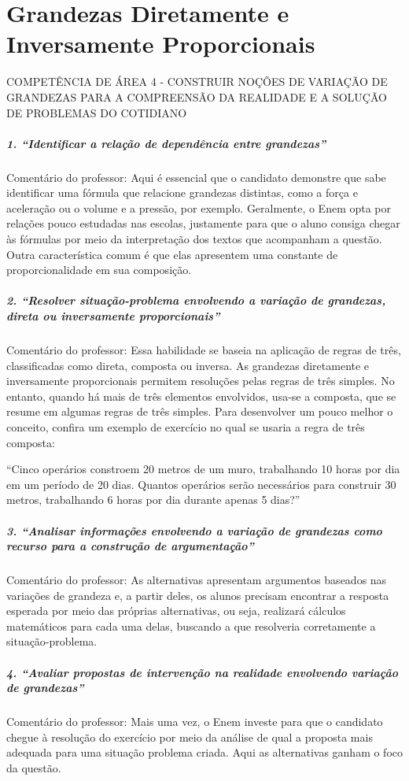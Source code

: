 \chapter{Grandezas Diretamente e Inversamente Proporcionais}

COMPETÊNCIA DE ÁREA 4 - CONSTRUIR NOÇÕES DE VARIAÇÃO DE GRANDEZAS PARA A COMPREENSÃO DA REALIDADE E A SOLUÇÃO DE PROBLEMAS DO COTIDIANO

\paragraph{1. “Identificar a relação de dependência entre grandezas”}
Comentário do professor: Aqui é essencial que o candidato demonstre que sabe identificar uma fórmula que relacione grandezas distintas, como a força e aceleração ou o volume e a pressão, por exemplo. Geralmente, o Enem opta por relações pouco estudadas nas escolas, justamente para que o aluno consiga chegar às fórmulas por meio da interpretação dos textos que acompanham a questão. Outra característica comum é que elas apresentem uma constante de proporcionalidade em sua composição.

\paragraph{2. “Resolver situação-problema envolvendo a variação de grandezas, direta ou inversamente proporcionais”}
Comentário do professor: Essa habilidade se baseia na aplicação de regras de três, classificadas como direta, composta ou inversa. As grandezas diretamente e inversamente proporcionais permitem resoluções pelas regras de três simples. No entanto, quando há mais de três elementos envolvidos, usa-se a composta, que se resume em algumas regras de três simples. Para desenvolver um pouco melhor o conceito, confira um exemplo de exercício no qual se usaria a regra de três composta:

“Cinco operários constroem 20 metros de um muro, trabalhando 10 horas por dia em um período de 20 dias. Quantos operários serão necessários para construir 30 metros, trabalhando 6 horas por dia durante apenas 5 dias?”

\paragraph{3. “Analisar informações envolvendo a variação de grandezas como recurso para a construção de argumentação”}
Comentário do professor: As alternativas apresentam argumentos baseados nas variações de grandeza e, a partir deles, os alunos precisam encontrar a resposta esperada por meio das próprias alternativas, ou seja, realizará cálculos matemáticos para cada uma delas, buscando a que resolveria corretamente a situação-problema.

\paragraph{4. “Avaliar propostas de intervenção na realidade envolvendo variação de grandezas”}
Comentário do professor: Mais uma vez, o Enem investe para que o candidato chegue à resolução do exercício por meio da análise de qual a proposta mais adequada para uma situação problema criada. Aqui as alternativas ganham o foco da questão.